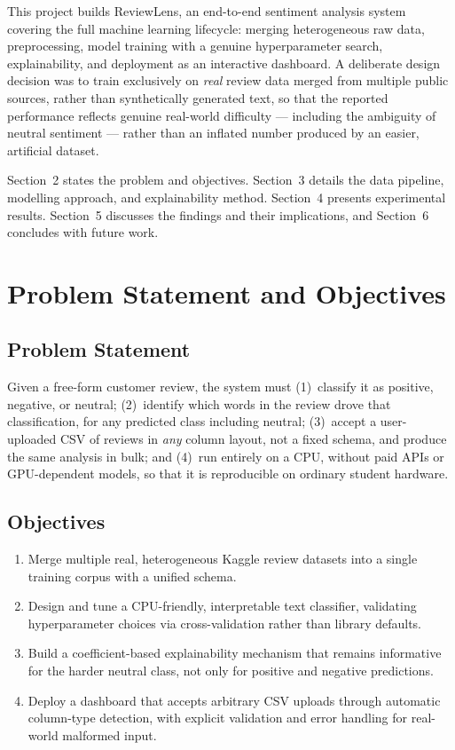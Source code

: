 \documentclass{article}
\begin{document}
This project builds ReviewLens, an end-to-end sentiment analysis system
covering the full machine learning lifecycle: merging heterogeneous raw
data, preprocessing, model training with a genuine hyperparameter search,
explainability, and deployment as an interactive dashboard. A deliberate
design decision was to train exclusively on \emph{real} review data merged
from multiple public sources, rather than synthetically generated text, so
that the reported performance reflects genuine real-world difficulty —
including the ambiguity of neutral sentiment — rather than an inflated
number produced by an easier, artificial dataset.

Section~2 states the problem and objectives. Section~3 details the data
pipeline, modelling approach, and explainability method. Section~4 presents
experimental results. Section~5 discusses the findings and their
implications, and Section~6 concludes with future work.

\section{Problem Statement and Objectives}

\subsection{Problem Statement}
Given a free-form customer review, the system must (1)~classify it as
positive, negative, or neutral; (2)~identify which words in the review
drove that classification, for any predicted class including neutral;
(3)~accept a user-uploaded CSV of reviews in \emph{any} column layout, not
a fixed schema, and produce the same analysis in bulk; and (4)~run entirely
on a CPU, without paid APIs or GPU-dependent models, so that it is
reproducible on ordinary student hardware.

\subsection{Objectives}
\begin{enumerate}[noitemsep]
    \item Merge multiple real, heterogeneous Kaggle review datasets into a
    single training corpus with a unified schema.
    \item Design and tune a CPU-friendly, interpretable text classifier,
    validating hyperparameter choices via cross-validation rather than
    library defaults.
    \item Build a coefficient-based explainability mechanism that remains
    informative for the harder neutral class, not only for positive and
    negative predictions.
    \item Deploy a dashboard that accepts arbitrary CSV uploads through
    automatic column-type detection, with explicit validation and error
    handling for real-world malformed input.
\end{enumerate}
\end{document}
